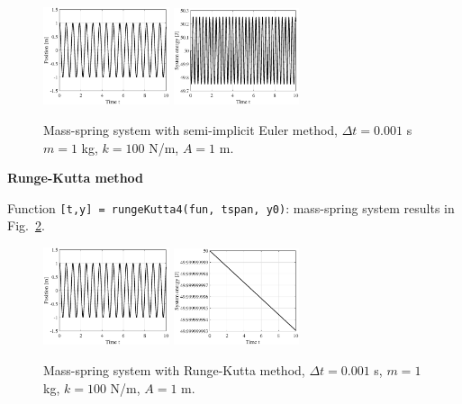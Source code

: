 \documentclass{article}
\begin{document}
	\begin{figure}[h!]
		\centering
		\includegraphics[width=0.33\textwidth]{simeuler_position.eps}
		\includegraphics[width=0.33\textwidth]{simeuler_energy.eps}
		\caption{Mass-spring system with semi-implicit Euler method, $\Delta t = 0.001$ s $m = 1$ kg, $k = 100$ N/m, $A = 1$ m.\label{fig:simeuler_mass_spring}}
	\end{figure}
	
	\textbf{Runge-Kutta method}
	
	Function \texttt{[t,y] = rungeKutta4(fun, tspan, y0)}: mass-spring system results in Fig.~\ref*{fig:rungekutta_mass_spring}.
	
	\begin{figure}[h!]
		\centering
		\includegraphics[width=0.33\textwidth]{rungekutta_position.eps}
		\includegraphics[width=0.33\textwidth]{rungekutta_energy.eps}
		\caption{Mass-spring system with Runge-Kutta method, $\Delta t = 0.001$ s, $m = 1$ kg, $k = 100$ N/m, $A = 1$ m.\label{fig:rungekutta_mass_spring}}
	\end{figure}
	
\end{document}
